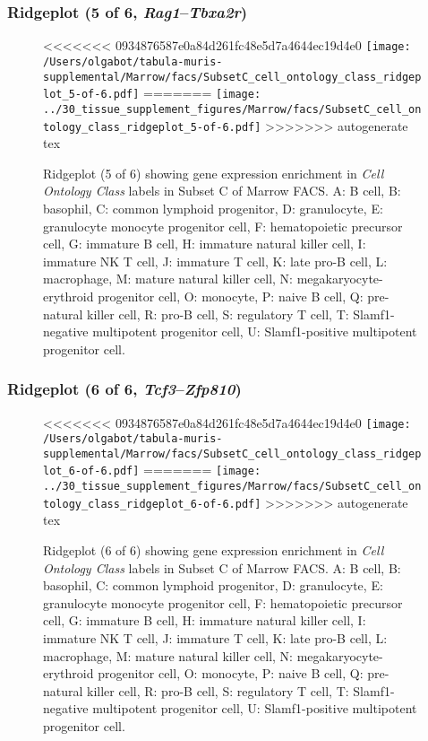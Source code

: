 \clearpage

\subsubsection{Ridgeplot (5 of 6, \emph{Rag1}--\emph{Tbxa2r})}
\begin{figure}[h]
\centering
<<<<<<< 0934876587e0a84d261fc48e5d7a4644ec19d4e0
\texttt{[image: /Users/olgabot/tabula-muris-supplemental/Marrow/facs/SubsetC\_cell\_ontology\_class\_ridgeplot\_5-of-6.pdf]}
=======
\texttt{[image: ../30\_tissue\_supplement\_figures/Marrow/facs/SubsetC\_cell\_ontology\_class\_ridgeplot\_5-of-6.pdf]}
>>>>>>> autogenerate tex

\caption{ Ridgeplot (5 of 6)  showing gene expression enrichment in \emph{Cell Ontology Class} labels in Subset C of Marrow FACS. A: B cell, B: basophil, C: common lymphoid progenitor, D: granulocyte, E: granulocyte monocyte progenitor cell, F: hematopoietic precursor cell, G: immature B cell, H: immature natural killer cell, I: immature NK T cell, J: immature T cell, K: late pro-B cell, L: macrophage, M: mature natural killer cell, N: megakaryocyte-erythroid progenitor cell, O: monocyte, P: naive B cell, Q: pre-natural killer cell, R: pro-B cell, S: regulatory T cell, T: Slamf1-negative multipotent progenitor cell, U: Slamf1-positive multipotent progenitor cell.}
\end{figure}


\clearpage

\subsubsection{Ridgeplot (6 of 6, \emph{Tcf3}--\emph{Zfp810})}
\begin{figure}[h]
\centering
<<<<<<< 0934876587e0a84d261fc48e5d7a4644ec19d4e0
\texttt{[image: /Users/olgabot/tabula-muris-supplemental/Marrow/facs/SubsetC\_cell\_ontology\_class\_ridgeplot\_6-of-6.pdf]}
=======
\texttt{[image: ../30\_tissue\_supplement\_figures/Marrow/facs/SubsetC\_cell\_ontology\_class\_ridgeplot\_6-of-6.pdf]}
>>>>>>> autogenerate tex

\caption{ Ridgeplot (6 of 6)  showing gene expression enrichment in \emph{Cell Ontology Class} labels in Subset C of Marrow FACS. A: B cell, B: basophil, C: common lymphoid progenitor, D: granulocyte, E: granulocyte monocyte progenitor cell, F: hematopoietic precursor cell, G: immature B cell, H: immature natural killer cell, I: immature NK T cell, J: immature T cell, K: late pro-B cell, L: macrophage, M: mature natural killer cell, N: megakaryocyte-erythroid progenitor cell, O: monocyte, P: naive B cell, Q: pre-natural killer cell, R: pro-B cell, S: regulatory T cell, T: Slamf1-negative multipotent progenitor cell, U: Slamf1-positive multipotent progenitor cell.}
\end{figure}


